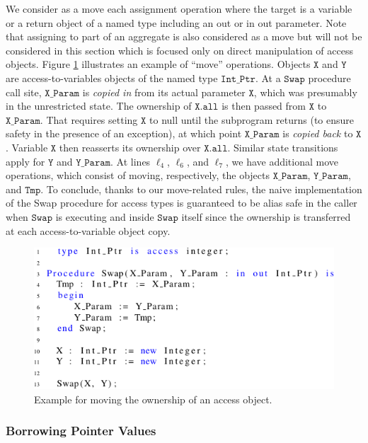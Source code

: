 \documentclass{llncs}
\newcommand\var[1]{\ensuremath{\mathtt{#1}}}
\newcommand{\keyword}[1]{\textsf{#1}}
\begin{document}
We consider as a move each assignment operation where the target is a variable or a return object of a named type including an \keyword{out} or \keyword{in out} parameter.
Note that assigning to part of an aggregate is also considered as a move but will not be considered in this section which is focused only on direct manipulation of access objects.
Figure \ref{fig:move_ex1} illustrates an example of ``move'' operations. Objects \var{X} and \var{Y} are access-to-variables objects of the named type \var{Int\_Ptr}. At a \var{Swap} procedure call site,
\var{X\_Param} is \textit{copied in} from its actual parameter \var{X}, which was presumably in the unrestricted state. The ownership of \var{X.all} is then passed from \var{X} to \var{X\_Param}.
That requires setting \var{X} to null until the subprogram returns (to ensure safety in the presence of an exception), at which point \var{X\_Param} is \textit{copied back} to \var{X}.
Variable \var{X} then reasserts its ownership over \var{X.all}. Similar state transitions apply for \var{Y} and \var{Y\_Param}.  At lines $\ell_4$, $\ell_6$, and $\ell_7$,
we have additional move operations, which consist of moving, respectively, the objects \var{X\_Param}, \var{Y\_Param}, and \var{Tmp}. To conclude, thanks to our move-related rules, the naive
implementation of the Swap procedure for access types is guaranteed to be alias safe in the caller when \var{Swap} is executing and inside \var{Swap} itself since the ownership is transferred
at each access-to-variable object copy. 

\begin{figure}[htb!]
\centering
   \includegraphics[]{move_ex1}
   \caption{Example for moving the ownership of an access object.}
   \label{fig:move_ex1}
\end{figure}
 

\subsubsection{Borrowing Pointer Values}
\label{sec:borrowing}
\end{document}
